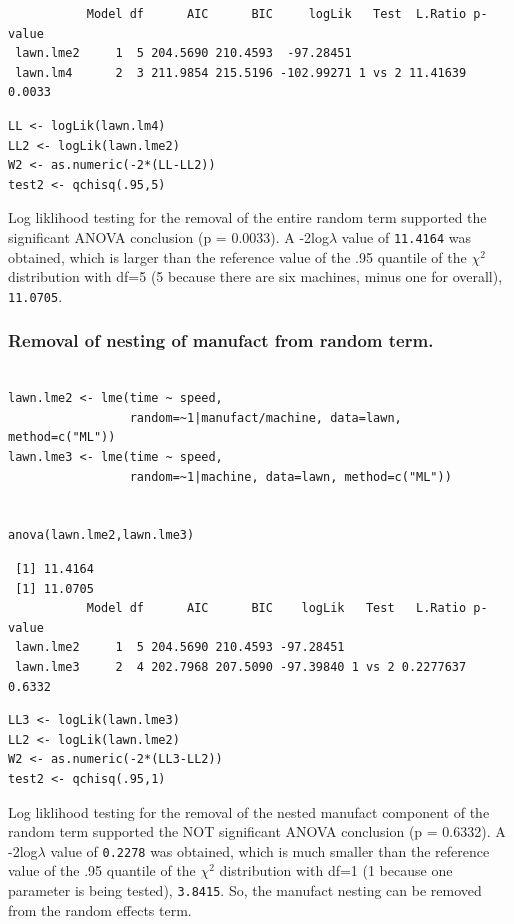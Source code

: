 \documentclass[11pt]{article}
\begin{document}
\begin{verbatim}
           Model df      AIC      BIC     logLik   Test  L.Ratio p-value
 lawn.lme2     1  5 204.5690 210.4593  -97.28451                        
 lawn.lm4      2  3 211.9854 215.5196 -102.99271 1 vs 2 11.41639  0.0033
\end{verbatim}


\begin{verbatim}
LL <- logLik(lawn.lm4)
LL2 <- logLik(lawn.lme2)
W2 <- as.numeric(-2*(LL-LL2))
test2 <- qchisq(.95,5)
\end{verbatim}

Log liklihood testing for the removal of the entire random term
supported the significant ANOVA conclusion (p = 0.0033). A
-2log$\lambda$ value of \texttt{11.4164} was obtained, which is 
larger than the reference value of  the .95 quantile of the $\chi$$^2$
distribution with df=5 (5 because there are six machines, minus one
for overall), \texttt{11.0705}.
\subsubsection{Removal of nesting of manufact from random term.}
\label{sec-2-3-2}



\begin{verbatim}

lawn.lme2 <- lme(time ~ speed, 
                 random=~1|manufact/machine, data=lawn, method=c("ML"))  
lawn.lme3 <- lme(time ~ speed, 
                 random=~1|machine, data=lawn, method=c("ML"))  


anova(lawn.lme2,lawn.lme3)
\end{verbatim}

\begin{verbatim}
 [1] 11.4164
 [1] 11.0705
           Model df      AIC      BIC    logLik   Test   L.Ratio p-value
 lawn.lme2     1  5 204.5690 210.4593 -97.28451                         
 lawn.lme3     2  4 202.7968 207.5090 -97.39840 1 vs 2 0.2277637  0.6332
\end{verbatim}


\begin{verbatim}
LL3 <- logLik(lawn.lme3)
LL2 <- logLik(lawn.lme2)
W2 <- as.numeric(-2*(LL3-LL2))
test2 <- qchisq(.95,1)
\end{verbatim}

Log liklihood testing for the removal of the nested manufact component
of the random term
supported the NOT significant ANOVA conclusion (p = 0.6332). A
-2log$\lambda$ value of \texttt{0.2278} was obtained,
which is much smaller than the reference value of  the .95 quantile 
of the $\chi$$^2$ distribution with df=1 
(1 because one parameter is being tested), 
\texttt{3.8415}. So, the manufact nesting can be
removed from the random effects term.
\end{document}
